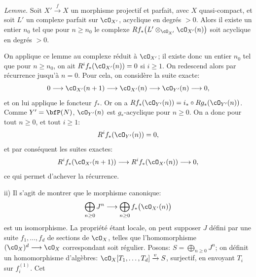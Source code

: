 \textit{Lemme.} Soit \(X'\xrightarrow{f}X\) un morphisme projectif et parfait, avec \(X\) quasi-compact, et soit \(L'\) un complexe parfait sur \(\cO_{X'}\), acyclique en degrés \(>0\). Alors il existe un entier \(n_0\) tel que pour \(n\ge n_0\) le complexe \(Rf_*\bigl(L'\otimes_{\cO_{X'}}\cO_{X'}(n)\bigr)\) soit acyclique en degrés \(>0\).

On applique ce lemme au complexe réduit à \(\cO_{X'}\); il existe donc un entier \(n_0\) tel que pour \(n\ge n_0\), on ait \(R^if_*(\cO_{X'}(n))=0\) si \(i\ge1\). On redescend alors par récurrence jusqu'à \(n=0\). Pour cela, on considère la suite exacte:
\[
0\longrightarrow
\cO_{X'}(n+1)
\longrightarrow
\cO_{X'}(n)
\longrightarrow
\cO_{Y'}(n)
\longrightarrow0,
\]
et on lui applique le foncteur \(f_*\). Or on a \(Rf_*(\cO_{Y'}(n))=i_*\circ Rg_*(\cO_{Y'}(n))\). Comme \(Y'=\bfP(N)\), \(\cO_{Y'}(n)\) est \(g_*\)-acyclique pour \(n\ge0\). On a donc pour tout \(n\ge0\), et tout \(i\ge1\):
\[
R^if_*(\cO_{Y'}(n))=0,
\]
et par conséquent les suites exactes:
\[
R^if_*(\cO_{X'}(n+1))
\longrightarrow
R^if_*(\cO_{X'}(n))
\longrightarrow0,
\]
ce qui permet d'achever la récurrence.

ii) Il s'agit de montrer que le morphisme canonique:
\[
\bigoplus_{n\ge0}J^n
\longrightarrow
\bigoplus_{n\ge0}f_*\bigl(\cO_{X'}(n)\bigr)
\]
est un isomorphisme. La propriété étant locale, on peut supposer \(J\) défini par une suite \(f_1,\ldots,f_d\) de sections de \(\cO_X\), telles que l'homomorphisme \((\cO_X)^d\longrightarrow\cO_X\) correspondant soit régulier. Posons: \(S=\bigoplus_{n\ge0}J^n\); on définit un homomorphisme d'algèbres: \(\cO_X[T_1,\ldots,T_d]\xrightarrow{v}S\), surjectif, en envoyant \(T_i\) sur \(f_i^{(1)}\). Cet
